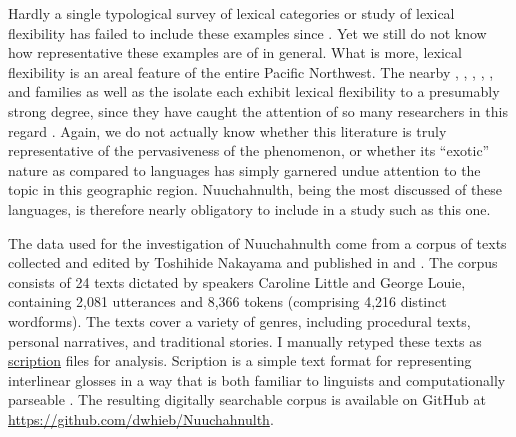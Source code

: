 Hardly a single typological survey of lexical categories or study of lexical flexibility has failed to include these examples since . Yet we still do not know how representative these examples are of  in general. What is more, lexical flexibility is an areal feature of the entire Pacific Northwest. The nearby , , , , , and  families as well as the isolate  each exhibit lexical flexibility to a presumably strong degree, since they have caught the attention of so many researchers in this regard . Again, we do not actually know whether this literature is truly representative of the pervasiveness of the phenomenon, or whether its \enquote{exotic} nature as compared to  languages has simply garnered undue attention to the topic in this geographic region. Nuuchahnulth, being the most discussed of these languages, is therefore nearly obligatory to include in a study such as this one.

The data used for the investigation of Nuuchahnulth come from a corpus of texts collected and edited by Toshihide Nakayama and published in \textcite{Little2003} and \textcite{Louie2003}. The corpus consists of 24 texts dictated by speakers Caroline Little and George Louie, containing 2,081 utterances and 8,366 tokens (comprising 4,216 distinct wordforms). The texts cover a variety of genres, including procedural texts, personal narratives, and traditional stories. I manually retyped these texts as \href{https://scription.digitallinguistics.io}{scription} files for analysis. Scription is a simple text format for representing interlinear glosses in a way that is both familiar to linguists and computationally parseable \parencite{Hieber2021b}. The resulting digitally searchable corpus is available on GitHub at \url{https://github.com/dwhieb/Nuuchahnulth}.

